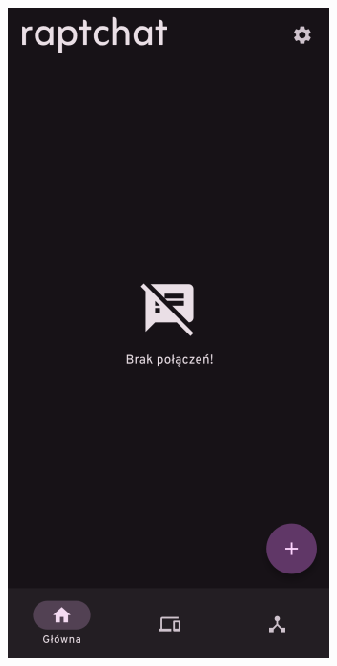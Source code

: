 \begin{figure}[H]
	\centering
	\begin{minipage}[b]{0.45\textwidth}
		\centering
		\includegraphics[width=\textwidth]{root/raptchat_home_dark.png}

\end{minipage}
\end{figure}
